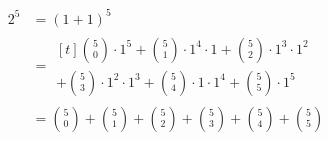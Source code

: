 \documentclass[nofonts]{ctexart}
\begin{document}
%
\begin{align*}
2^5	&= (1+1)^5							\\
	&= \begin{multlined}[t]
		\binom50\cdot 1^5 + \binom51\cdot 1^4 \cdot 1
		+ \binom52\cdot 1^3 \cdot 1^2				\\
		+ \binom53\cdot 1^2 \cdot 1^3 + \binom54\cdot 1 \cdot 1^4
		+ \binom55\cdot 1^5
	\end{multlined}							\\
	&= \binom50 + \binom51 + \binom52 + \binom53 + \binom54 + \binom55
\end{align*}
\end{document}
